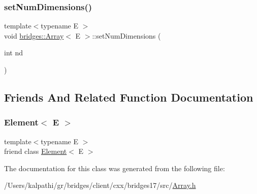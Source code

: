 \subsubsection{\texorpdfstring{set\+Num\+Dimensions()}{setNumDimensions()}}
{\footnotesize\ttfamily template$<$typename E $>$ \\
void \mbox{\hyperlink{classbridges_1_1_array}{bridges\+::\+Array}}$<$ E $>$\+::set\+Num\+Dimensions (\begin{DoxyParamCaption}\item[{int}]{nd }\end{DoxyParamCaption})\hspace{0.3cm}{\ttfamily [inline]}}



\subsection{Friends And Related Function Documentation}
\mbox{\label{classbridges_1_1_array_a8c6ff2a8dd3e27346dd25f588a78828a}} 
\subsubsection{\texorpdfstring{Element$<$ E $>$}{Element< E >}}
{\footnotesize\ttfamily template$<$typename E $>$ \\
friend class \mbox{\hyperlink{classbridges_1_1_element}{Element}}$<$ E $>$\hspace{0.3cm}{\ttfamily [friend]}}



The documentation for this class was generated from the following file\+:\begin{DoxyCompactItemize}
\item 
/\+Users/kalpathi/gr/bridges/client/cxx/bridges17/src/\mbox{\hyperlink{_array_8h}{Array.\+h}}\end{DoxyCompactItemize}
